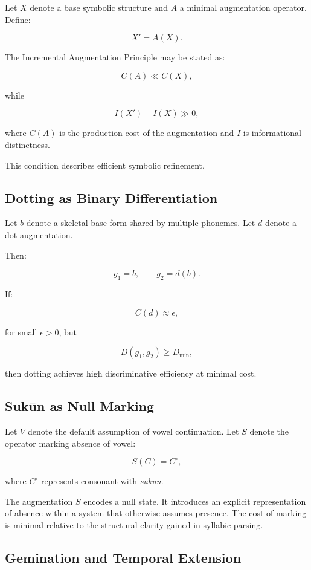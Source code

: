 \documentclass[11pt]{article}
\begin{document}
Let $X$ denote a base symbolic structure and $A$ a minimal augmentation operator. Define:

\[
X' = A(X).
\]

The Incremental Augmentation Principle may be stated as:

\[
C(A) \ll C(X),
\]

while

\[
I(X') - I(X) \gg 0,
\]

where $C(A)$ is the production cost of the augmentation and $I$ is informational distinctness.

This condition describes efficient symbolic refinement.

\subsection{Dotting as Binary Differentiation}

Let $b$ denote a skeletal base form shared by multiple phonemes. Let $d$ denote a dot augmentation.

Then:

\[
g_1 = b, \qquad g_2 = d(b).
\]

If:

\[
C(d) \approx \epsilon,
\]

for small $\epsilon > 0$, but

\[
D(g_1, g_2) \geq D_{\text{min}},
\]

then dotting achieves high discriminative efficiency at minimal cost.

\subsection{Sukūn as Null Marking}

Let $V$ denote the default assumption of vowel continuation. Let $S$ denote the operator marking absence of vowel:

\[
S(C) = C^\circ,
\]

where $C^\circ$ represents consonant with \textit{sukūn}.

The augmentation $S$ encodes a null state. It introduces an explicit representation of absence within a system that otherwise assumes presence. The cost of marking is minimal relative to the structural clarity gained in syllabic parsing.

\subsection{Gemination and Temporal Extension}
\end{document}
